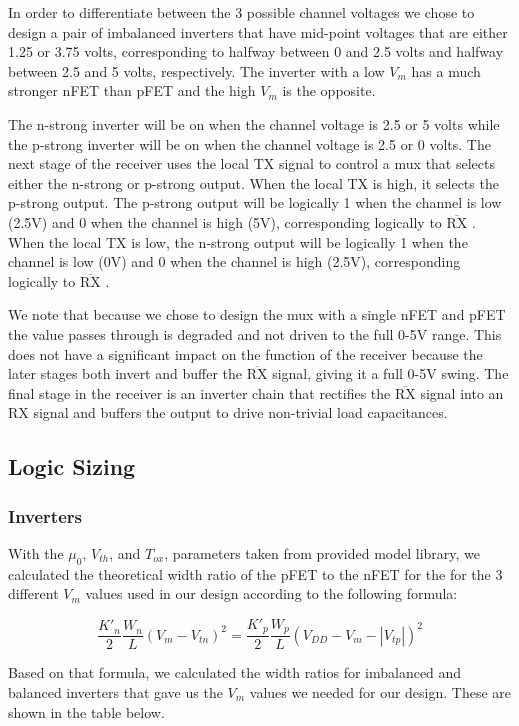 \documentclass[12pt, letterpaper]{article}
\newcommand{\Vm}{$V_m$ } %
\newcommand{\RXp}{$\overline{\mbox{RX}}$ } %
\begin{document}
In order to differentiate between the 3 possible channel voltages we chose to design a pair of imbalanced inverters that have mid-point voltages that are either 1.25 or 3.75 volts, corresponding to halfway between 0 and 2.5 volts and halfway between 2.5 and 5 volts, respectively.
The inverter with a low \Vm has a much stronger nFET than pFET and the high \Vm is the opposite.
\par
The n-strong inverter will be on when the channel voltage is 2.5 or 5 volts while the p-strong inverter will be on when the channel voltage is 2.5 or 0 volts.
The next stage of the receiver uses the local TX signal to control a mux that selects either the n-strong or p-strong output.
When the local TX is high, it selects the p-strong output.
The p-strong output will be logically 1 when the channel is low (2.5V) and 0 when the channel is high (5V), corresponding logically to \RXp.
When the local TX is low, the n-strong output will be logically 1 when the channel is low (0V) and 0 when the channel is high (2.5V), corresponding logically to \RXp.
\par
We note that because we chose to design the mux with a single nFET and pFET the value passes through is degraded and not driven to the full 0-5V range.
This does not have a significant impact on the function of the receiver because the later stages both invert and buffer the \RXp signal, giving it a full 0-5V swing.
The final stage in the receiver is an inverter chain that rectifies the \RXp signal into an RX signal and buffers the output to drive non-trivial load capacitances.

\subsection{Logic Sizing}

\subsubsection{Inverters}
With the $\mu_0$, $V_{th}$, and $T_{ox}$, parameters taken from provided model library, we calculated the theoretical width ratio of the pFET to the nFET for the for the 3 different \Vm values used in our design according to the following formula:

\[
\frac{K'_n}{2} \frac{W_n}{L} (V_m - V_{tn}) ^ 2 =
\frac{K'_p}{2} \frac{W_p}{L} (V_{DD} - V_m - |V_{tp}|) ^ 2
\]

Based on that formula, we calculated the width ratios for imbalanced and balanced inverters that gave us the \Vm values we needed for our design.
These are shown in the table below.
\end{document}
